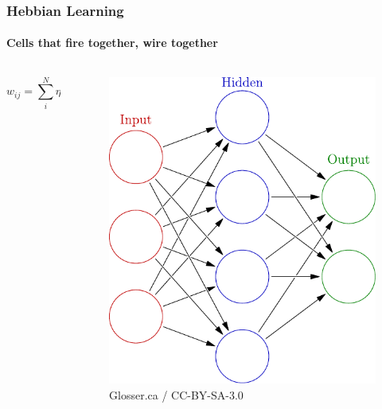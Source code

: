 \documentclass[mathserif]{beamer}
\begin{document}
\begin{frame}
\frametitle{Hebbian Learning}
\framesubtitle{Cells that fire together, wire together}
  \begin{columns}[T]
    \begin{column}{.5\textwidth}
      \begin{equation*}
      w_{ij} = \sum^N_i \eta  x_i x_j
      \end{equation*}

    \end{column}
    \begin{column}{.5\textwidth}
\begin{figure}
 \centering
 \includegraphics[width=\linewidth]{./fig/3-layer.pdf}
  \caption{Glosser.ca / CC-BY-SA-3.0}
\end{figure}
    \end{column}
  \end{columns}
\end{frame}
\end{document}
